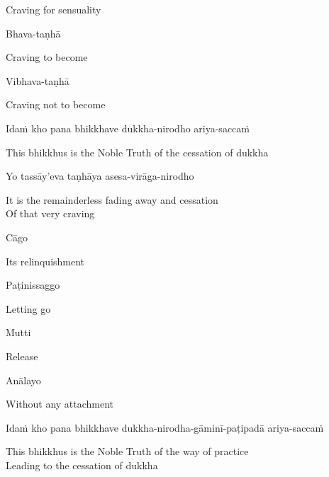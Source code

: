 \begin{english}
  Craving for sensuality
\end{english}

Bhava-taṇhā

\begin{english}
  Craving to become
\end{english}

Vibhava-taṇhā

\begin{english}
  Craving not to become
\end{english}

Idaṁ kho pana bhikkhave dukkha-nirodho ariya-saccaṁ

\begin{english}
  This bhikkhus is the Noble Truth of the cessation of dukkha
\end{english}

Yo tassāy'eva taṇhāya asesa-virāga-nirodho

\begin{english}
  It is the remainderless fading away and cessation\\
  Of that very craving
\end{english}

Cāgo

\begin{english}
  Its relinquishment
\end{english}

Paṭinissaggo

\begin{english}
  Letting go
\end{english}

Mutti

\begin{english}
  Release
\end{english}

Anālayo

\begin{english}
  Without any attachment
\end{english}

\begin{pali-hang}
  Idaṁ kho pana bhikkhave dukkha-nirodha-gāminī-paṭipadā ariya-saccaṁ
\end{pali-hang}

\begin{english}
  This bhikkhus is the Noble Truth of the way of practice\\
  Leading to the cessation of dukkha
\end{english}

